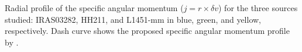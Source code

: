 Radial profile of the specific angular momentum ($j=r \times \delta v$) for the three sources studied: 
IRAS03282, HH211, and L1451-mm in blue, green, and yellow, respectively. 
Dash curve shows the proposed specific angular momentum profile by \cite{Belloche_2013}. 

  
  